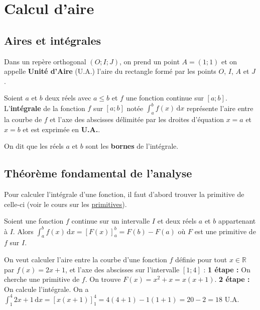 


	
	\section{Calcul d'aire}
	
	\subsection{Aires et intégrales}
	
	Dans un repère orthogonal $(O; I; J)$, on prend un point $A = (1; 1)$ et on appelle \textbf{Unité d'Aire} (U.A.) l'aire du rectangle formé par les points $O$, $I$, $A$ et $J$.
	
	
	Soient $a$ et $b$ deux réels avec $a \leq b$ et $f$ une fonction continue sur $[a;b]$. L'\textbf{intégrale} de la fonction $f$ sur $[a;b]$ notée
	$\displaystyle{\int_{a}^{b} f(x) \, \mathrm{d}x}$ représente l'aire entre la courbe de $f$ et l'axe des abscisses délimitée par les droites d'équation $x = a$ et $x = b$
	et est exprimée en \textbf{U.A.}.
	
	
	On dit que les réels $a$ et $b$ sont les \textbf{bornes} de l'intégrale.
	
	\subsection{Théorème fondamental de l'analyse}
	
	Pour calculer l'intégrale d'une fonction, il faut d'abord trouver la primitive de celle-ci (voir le cours sur les \href{https://bacomathiqu.es/cours/terminale/primitives-equations-differentielles/}{primitives}).
	
	\begin{formula}
		Soient une fonction $f$ continue sur un intervalle $I$ et deux réels $a$ et $b$ appartenant à $I$.
		\newpar
		Alors $\displaystyle{\int_{a}^{b} f(x) \, \mathrm{d}x = \left[ F(x) \right]_a^b = F(b) - F(a)}$ où $F$ est une primitive de $f$ sur $I$.
	\end{formula}
	
	\begin{tip}[Exemple]
		On veut calculer l'aire entre la courbe d'une fonction $f$ définie pour tout $x \in \mathbb{R}$ par $f(x) = 2x + 1$, et l'axe des abscisses sur l'intervalle $[1;4]$ :
		\newpar
		\textbf{1\iere{} étape :} On cherche une primitive de $f$. On trouve $F(x) = x^2 + x = x(x + 1)$.
		\newpar
		\textbf{2\ieme{} étape :} On calcule l'intégrale.
		On a $\displaystyle{\int_{1}^{4} 2x + 1 \, \mathrm{d}x} = \left[ x(x + 1) \right]_1^4 = 4(4 + 1) - 1(1 + 1) = 20 - 2 = 18$ U.A.
		\newpar
	\end{tip}
	
